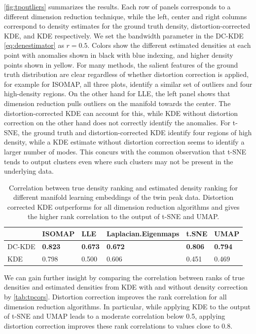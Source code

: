 \documentclass[11pt,a4paper,]{article}
\begin{document}
\autoref{fig:tpoutliers} summarizes the results. Each row of panels corresponds to a different dimension reduction technique, while the left, center and right columns correspond to density estimates for the ground truth density, distortion-corrected KDE, and KDE respectively. We set the bandwidth parameter in the DC-KDE \eqref{eq:denestimator} as \(r=0.5\). Colors show the different estimated densities at each point with anomalies shown in black with blue indexing, and higher density points shown in yellow. For many methods, the salient features of the ground truth distribution are clear regardless of whether distortion correction is applied, for example for ISOMAP, all three plots, identify a similar set of outliers and four high-density regions. On the other hand for LLE, the left panel shows that dimension reduction pulls outliers on the manifold towards the center. The distortion-corrected KDE can account for this, while KDE without distortion correction on the other hand does not correctly identify the anomalies. For t-SNE, the ground truth and distortion-corrected KDE identify four regions of high density, while a KDE estimate without distortion correction seems to identify a larger number of modes. This concurs with the common observation that t-SNE tends to output clusters even where such clusters may not be present in the underlying data.

\begin{table}

\caption{\label{tab:tpcors}Correlation between true density ranking and estimated density ranking for different manifold learning embeddings of the twin peak data. Distortion corrected KDE outperforms for all dimension reduction algorithms and gives the higher rank correlation to the output of t-SNE and UMAP.}
\centering
\begin{tabular}[t]{l>{}l>{}l>{}l>{}l>{}l}
\toprule
  & ISOMAP & LLE & Laplacian.Eigenmaps & t.SNE & UMAP\\
\midrule
DC-KDE & \textbf{0.823} & \textbf{0.673} & \textbf{0.672} & \textbf{0.806} & \textbf{0.794}\\
KDE & 0.798 & 0.500 & 0.606 & 0.451 & 0.469\\
\bottomrule
\end{tabular}
\end{table}

We can gain further insight by comparing the correlation between ranks of true densities and estimated densities from KDE with and without density correction by \autoref{tab:tpcors}. Distortion correction improves the rank correlation for all dimension reduction algorithms. In particular, while applying KDE to the output of t-SNE and UMAP leads to a moderate correlation below 0.5, applying distortion correction improves these rank correlations to values close to 0.8.
\end{document}
